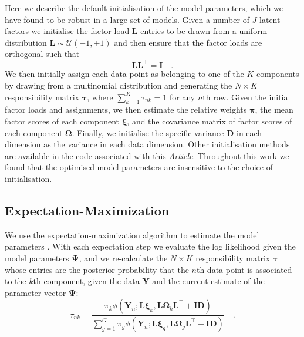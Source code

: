 \documentclass[twocolumn]{aastex62}
\newcommand{\vect}[1]{\boldsymbol{\mathbf{#1}}}
\renewcommand{\vec}[1]{\vect{#1}}
\newcommand{\weight}{\pi}
\newcommand{\data}{\textbf{Y}}
\newcommand{\vecdata}{\vec\data}
\newcommand{\transpose}{^\intercal}
\newcommand{\eye}{\textbf{I}}
\newcommand{\factorloads}{\textbf{L}}
\newcommand{\specificvariance}{\vec{D}}
\newcommand{\scoremeans}{\vec\xi}
\newcommand{\scorecovs}{\vec\Omega}
\newcommand{\NumData}{N}
\newcommand{\numdata}{n}
\newcommand{\NumLatentFactors}{J}
\newcommand{\NumComponents}{K}
\newcommand{\numcomponents}{k}
\begin{document}
Here we describe the default initialisation of the model parameters, which
we have found to be robust in a large set of models. Given a number of
$\NumLatentFactors$ latent factors we initialise the factor load
$\factorloads$ entries to be drawn from a uniform distribution
$\factorloads \sim \mathcal{U}\left(-1, +1\right)$ and then ensure that
the factor loads are orthogonal such that
\begin{equation}
	\factorloads \factorloads\transpose = \eye \quad .
\end{equation}
We then initially assign each data point as belonging to one of the
$\NumComponents$ components by drawing from a multinomial distribution
and generating the $\NumData \times \NumComponents$ responsibility matrix $\vec\tau$,
where $\sum_{k=1}^{K} \tau_{nk} = 1$ for any $n$th row. Given the initial
factor loads and assignments, we then estimate the relative weights
$\vec\pi$, the mean factor scores of each component $\scoremeans$, and
the covariance matrix of factor scores of each component $\scorecovs$.
Finally, we initialise the specific variance $\specificvariance$ in each
dimension as the variance in each data dimension. Other initialisation 
methods are available in the code associated with this \emph{Article}. 
Throughout this work we found that the optimised model parameters are 
insensitive to the choice of initialisation.


\subsection{Expectation-Maximization}

We use the expectation-maximization algorithm to estimate the model parameters
\citep{Dempster:1977}. With each expectation step we evaluate the log likelihood 
given the model parameters $\vec\Psi$, and we re-calculate the $\NumData \times \NumComponents$ responsibility 
matrix $\vec\tau$ whose entries are the posterior probability that the 
$\numdata$th data point is associated to the $\numcomponents$th component, given 
the data $\vecdata$ and the current estimate of the parameter vector $\vec\Psi$:
\begin{equation}
	\tau_{\numdata\numcomponents} = \frac{\weight_\numcomponents\phi(\vecdata_\numdata;\factorloads\scoremeans_\numcomponents, \factorloads\scorecovs_\numcomponents\factorloads\transpose + \eye\specificvariance)}{\sum_{g=1}^{G}\weight_g\phi(\vecdata_\numdata;\factorloads\scoremeans_g, \factorloads\scorecovs_g\factorloads\transpose + \eye\specificvariance)} \quad .
\end{equation}
\end{document}
